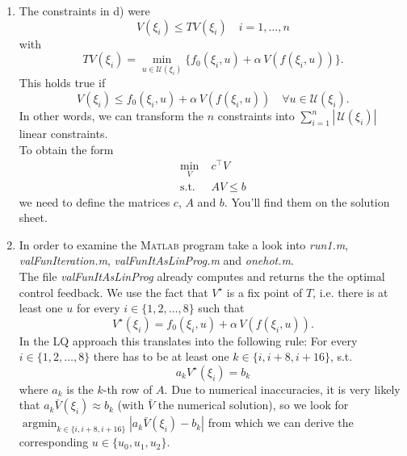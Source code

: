 \documentclass[12pt,pdftex,a4paper]{scrartcl}
\DeclareMathOperator*{\argmin}{argmin}
\begin{document}
\begin{enumerate}
	\item The constraints in d) were
	\begin{equation*}
		V(\xi_i) \le TV(\xi_i) \quad i = 1,\ldots, n
	\end{equation*}
	with
	\begin{equation*}
		TV(\xi_i) = \min_{u\in\mathcal{U}(\xi_i)}\{ f_0(\xi_i,u) + \alpha\,V(f(\xi_i,u))\}.
	\end{equation*}
	This holds true if
	\begin{equation*}
		V(\xi_i) \le  f_0(\xi_i,u) + \alpha\,V(f(\xi_i,u))\quad \forall u\in\mathcal{U}(\xi_i).
	\end{equation*}
	In other words, we can transform the $n$ constraints into $\sum_{i=1}^n |\,\mathcal{U}(\xi_i)|$ linear constraints.\\
	To obtain the form
	\begin{equation*}
		\begin{split}
			\min_V \;& c^\top V\\
			\text{s.t.} \;& AV \le b
		\end{split}
	\end{equation*}
	we need to define the matrices $c$, $A$ and $b$. You'll find them on the solution sheet.
	
	\item In order to examine the \textsc{Matlab} program take a look into \emph{run1.m}, \emph{valFunIteration.m}, \emph{valFunItAsLinProg.m} and \emph{onehot.m}.\\
	The file \emph{valFunItAsLinProg} already computes and returns the the optimal control feedback. We use the fact that $V^\star$ is a fix point of $T$, i.e. there is at least one $u$ for every $i \in \{1,2,\ldots ,8\}$ such that
	\begin{equation*}
		V^\star(\xi_i) =  f_0(\xi_i,u) + \alpha\,V(f(\xi_i,u)).
	\end{equation*}
	In the LQ approach this translates into the following rule: For every $i \in \{1,2,\ldots ,8\}$ there has to be at least one $k \in \{i, i+8, i+16\}$, s.t.
	\begin{equation*}
		a_k V^\star(\xi_i) = b_k
	\end{equation*}
	where $a_k$ is the $k$-th row of $A$. Due to numerical inaccuracies, it is very likely that $a_k \bar{V}(\xi_i) \approx b_k$ (with $\bar{V}$ the numerical solution), so we look for $\argmin_{k \in \{i, i+8, i+16\}} |a_k \bar{V}(\xi_i) - b_k|$ from which we can derive the corresponding $u\in\{u_0,u_1,u_2\}$.
\end{enumerate}
\end{document}
